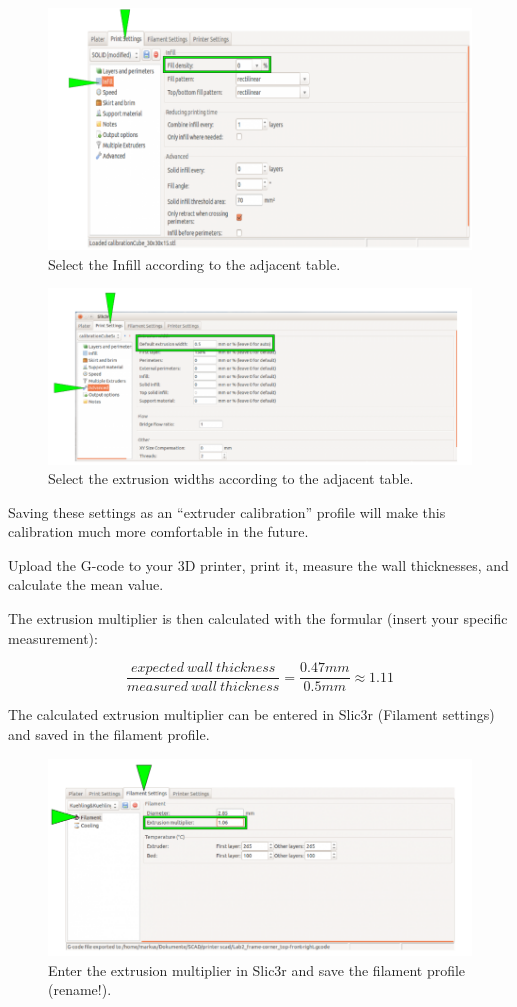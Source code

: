 \begin{figure}[H]
  \centering
  \includegraphics[width=.7\linewidth]{./img/slic3r_selectprintsettingsinfill_calibrateextrusion.png}
  \caption{Select the Infill according to the adjacent table.}
\end{figure}

\begin{figure}[H]
  \centering
  \includegraphics[width=.7\linewidth]{./img/slic3r_selectprintsettings_calibrateextrusion_advanced.png}
  \caption{Select the extrusion widths according to the adjacent table.}
\end{figure}

\begin{info}
  Saving these settings as an “extruder calibration” profile will make this calibration much more comfortable in the future.
\end{info}

Upload the G-code to your 3D printer, print it, measure the wall thicknesses, and calculate the mean value.

The extrusion multiplier is then calculated with the formular (insert your specific measurement):

$$
\frac{expected\ wall\ thickness}{measured\ wall\ thickness} = \frac{0.47 mm}{0.5mm} \approx 1.11
$$

The calculated extrusion multiplier can be entered in Slic3r (Filament settings) and saved in the filament profile. 

\begin{figure}[H]
  \centering
  \includegraphics[width=.7\linewidth]{./img/tt_extrusionmultiplier.png}
  \caption{Enter the extrusion multiplier in Slic3r and 
           save the filament profile (rename!).}
\end{figure}

